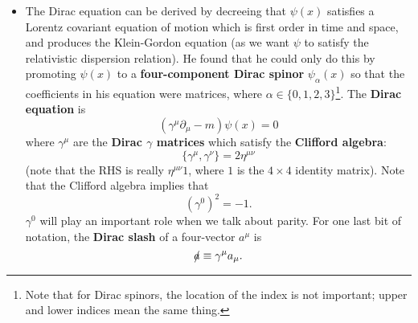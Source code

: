 \documentclass[12pt, oneside]{article}   	%
\theoremstyle{definition}
\begin{document}
\begin{itemize}
	\item The Dirac equation can be derived by decreeing that $\psi(x)$ satisfies a Lorentz covariant equation of motion which is first order in time and space, and produces the Klein-Gordon equation (as we want $\psi$ to satisfy the relativistic dispersion relation). He found that he could only do this by promoting $\psi(x)$ to a \textbf{four-component Dirac spinor} $\psi_\alpha(x)$ so that the coefficients in his equation were matrices, where $\alpha\in \{0, 1, 2, 3\}$\footnote{Note that for Dirac spinors, the location of the index is not important; upper and lower indices mean the same thing.}. The \textbf{Dirac equation} is
	\begin{equation}
		(\gamma^\mu\partial_\mu - m)\psi(x) = 0
	\end{equation}
	where $\gamma^\mu$ are the \textbf{Dirac $\gamma$ matrices} which satisfy the \textbf{Clifford algebra}:
	\begin{equation}
		\{\gamma^\mu, \gamma^\nu\} = 2\eta^{\mu\nu} \label{eq:clifford}
	\end{equation}
	(note that the RHS is really $\eta^{\mu\nu}1$, where $1$ is the $4\times 4$ identity matrix). Note that the Clifford algebra implies that
	\begin{equation}
		(\gamma^0)^2 = -1.
	\end{equation}
	$\gamma^0$ will play an important role when we talk about parity. For one last bit of notation, the \textbf{Dirac slash} of a four-vector $a^\mu$ is
	\begin{equation}
		\slashed a \equiv \gamma^\mu a_\mu.
	\end{equation}
	

\end{itemize}
\end{document}
